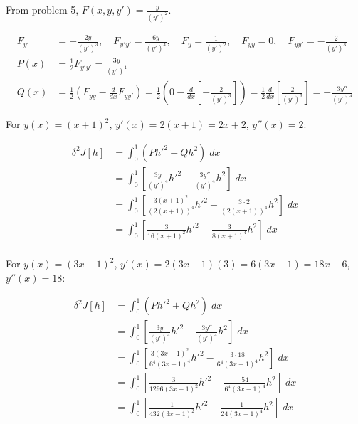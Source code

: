 \documentclass[a4paper]{article}
\begin{document}
From problem 5, $F(x,y,y') = \frac{y}{(y')^2}$.

\begin{align*}
F_{y'} &= -\frac{2y}{(y')^3}, \quad F_{y'y'} = \frac{6y}{(y')^4}, \quad F_y = \frac{1}{(y')^2}, \quad F_{yy} = 0, \quad F_{yy'} = -\frac{2}{(y')^3}\\
P(x) &= \frac{1}{2}F_{y'y'} = \frac{3y}{(y')^4} \\
Q(x) &= \frac{1}{2}\left(F_{yy} - \frac{d}{dx}F_{yy'} \right) = \frac{1}{2}\left(0- \frac{d}{dx}\left[-\frac{2}{(y')^3} \right]\right) =  \frac{1}{2}\frac{d}{dx}\left[\frac{2}{(y')^3}\right] = -\frac{3y''}{(y')^4}
\end{align*}

For $y(x) = (x+1)^2$, $y'(x) = 2(x+1) = 2x+2$, $y''(x) = 2$:

\begin{align*}
\delta^2 J[h] &= \int_0^1 (P h'^2 + Qh^2) \; dx \\
&= \int_0^1 \left[\frac{3y}{(y')^4} h'^2 - \frac{3y''}{(y')^4} h^2 \right] \; dx \\
&= \int_0^1 \left[\frac{3(x+1)^2}{(2(x+1))^4} h'^2 - \frac{3\cdot 2}{(2(x+1))^4} h^2 \right] \; dx \\
&= \int_0^1 \left[\frac{3}{16(x+1)^2} h'^2 - \frac{3}{8(x+1)^4}  h^2 \right] \; dx \\
\end{align*}

For $y(x) = (3x-1)^2$, $y'(x) = 2(3x-1)(3) = 6(3x-1) =  18x-6$, $y''(x) = 18$:

\begin{align*}
\delta^2 J[h] &= \int_0^1 (P h'^2 + Qh^2) \; dx \\
&= \int_0^1 \left[\frac{3y}{(y')^4} h'^2 -  \frac{3y''}{(y')^4} h^2 \right] \; dx \\
&= \int_0^1 \left[\frac{3(3x-1)^2}{6^4(3x-1)^4} h'^2 -  \frac{3\cdot 18}{6^4(3x-1)^4} h^2 \right] \; dx \\
&= \int_0^1 \left[\frac{3}{1296(3x-1)^2} h'^2 -  \frac{54}{6^4(3x-1)^4} h^2 \right] \; dx \\
&= \int_0^1 \left[\frac{1}{432(3x-1)^2} h'^2 - \frac{1}{24(3x-1)^4}  h^2 \right] \; dx \\
\end{align*}
\end{document}
